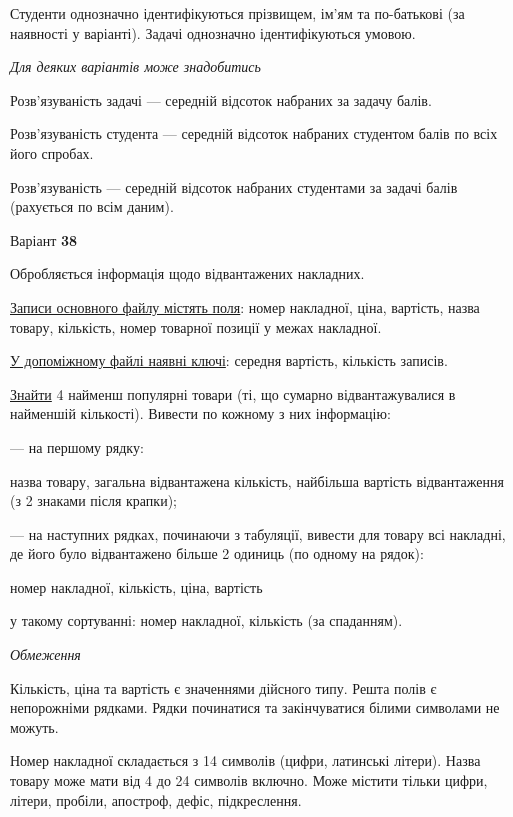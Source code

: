 \documentclass[11pt, ukrainian]{article}
\begin{document}
Студенти однозначно ідентифікуються прізвищем, ім’ям та по-батькові (за наявності у варіанті).
Задачі однозначно ідентифікуються умовою.

\bigskip\textit{Для деяких варіантів може знадобитись}

Розв'язуваність задачі --- середній відсоток набраних за задачу балів.

Розв'язуваність студента --- середній відсоток набраних студентом балів по всіх його спробах.

Розв'язуваність --- середній відсоток набраних студентами за задачі балів (рахується по всім даним).




\par
\newpage
{\center Варіант  \No \textbf { 38 }\par}
\bigskip
Обробляється інформація щодо відвантажених накладних.

\underline{Записи основного файлу містять поля}: номер накладної, ціна, вартість, назва товару, кількість, номер товарної позиції у межах накладної.

\underline{У допоміжному файлі наявні ключі}: середня вартість, кількість записів.

\underline{Знайти} 4 найменш популярні товари (ті, що сумарно відвантажувалися в найменшій кількості). Вивести по кожному з них інформацію:\par
{\noindent}--- на першому рядку:\par
назва товару, загальна відвантажена кількість, найбільша вартість відвантаження (з 2 знаками після крапки);

{\noindent}--- на наступних рядках, починаючи з табуляції, вивести для товару всі накладні, де його було відвантажено більше 2 одиниць (по одному на рядок):\par
номер накладної, кількість, ціна, вартість

{\noindent}у такому сортуванні: номер накладної, кількість (за спаданням).


\bigskip\textit{Обмеження}

Кількість, ціна та вартість є значеннями дійсного типу.
Решта полів є непорожніми рядками.
Рядки починатися та закінчуватися білими символами не можуть.

Номер накладної складається з 14 символів (цифри, латинські літери).
Назва товару може мати від 4 до 24 символів включно.
Може містити тільки цифри, літери, пробіли, апостроф, дефіс, підкреслення.
\end{document}
